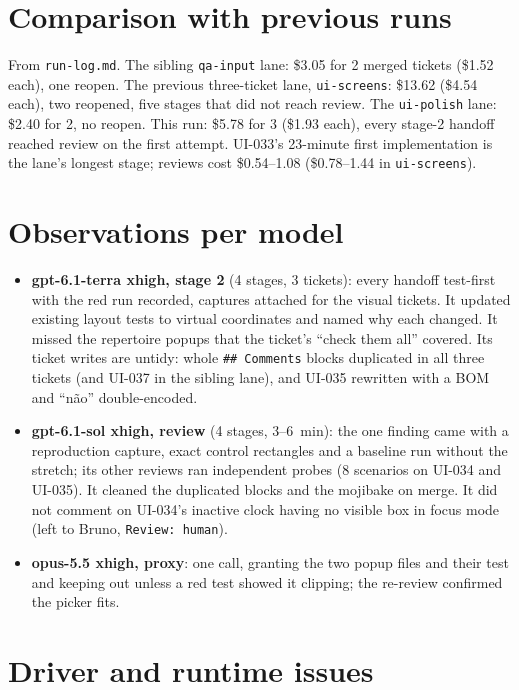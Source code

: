 \documentclass[11pt,a4paper]{article}
\begin{document}
\section*{Comparison with previous runs}

From \texttt{run-log.md}. The sibling \texttt{qa-input} lane: \$3.05 for 2 merged tickets (\$1.52
each), one reopen. The previous three-ticket lane, \texttt{ui-screens}: \$13.62 (\$4.54 each), two
reopened, five stages that did not reach review. The \texttt{ui-polish} lane: \$2.40 for 2, no
reopen. This run: \$5.78 for 3 (\$1.93 each), every stage-2 handoff reached review on the first
attempt. UI-033's 23-minute first implementation is the lane's longest stage; reviews cost
\$0.54--1.08 (\$0.78--1.44 in \texttt{ui-screens}).

\section*{Observations per model}

\begin{itemize}
  \item \textbf{gpt-6.1-terra xhigh, stage 2} (4 stages, 3 tickets): every handoff test-first with
        the red run recorded, captures attached for the visual tickets. It updated existing layout
        tests to virtual coordinates and named why each changed. It missed the repertoire popups
        that the ticket's ``check them all'' covered. Its ticket writes are untidy: whole
        \texttt{\#\# Comments} blocks duplicated in all three tickets (and UI-037 in the sibling
        lane), and UI-035 rewritten with a BOM and ``n\~{a}o'' double-encoded.
  \item \textbf{gpt-6.1-sol xhigh, review} (4 stages, 3--6~min): the one finding came with a
        reproduction capture, exact control rectangles and a baseline run without the stretch; its
        other reviews ran independent probes (8 scenarios on UI-034 and UI-035). It cleaned the
        duplicated blocks and the mojibake on merge. It did not comment on UI-034's inactive clock
        having no visible box in focus mode (left to Bruno, \texttt{Review: human}).
  \item \textbf{opus-5.5 xhigh, proxy}: one call, granting the two popup files and their test and
        keeping  out unless a red test showed it clipping; the re-review
        confirmed the picker fits.
\end{itemize}

\section*{Driver and runtime issues}
\end{document}
